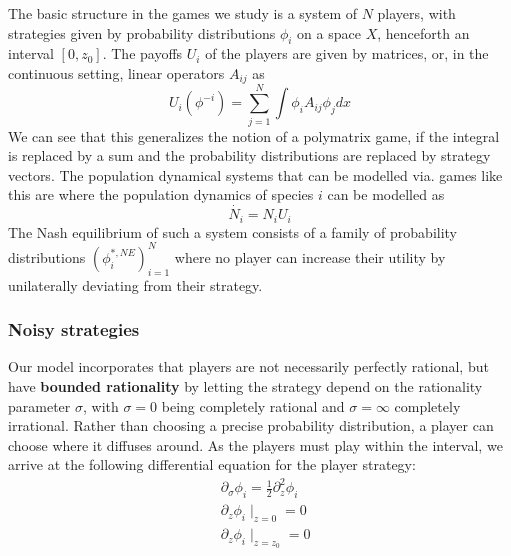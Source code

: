 The basic structure in the games we study is a system of $N$ players, with strategies given by probability distributions $\phi_i$ on a space $X$, henceforth an interval $[0,z_0]$. The payoffs $U_i$ of the players are given by matrices, or, in the continuous setting, linear operators $A_{ij}$ as
\begin{equation}
  \label{eq:utility}
  U_i(\phi^{-i}) = \sum_{j=1}^N \int \phi_i A_{ij} \phi_j dx
\end{equation}
We can see that this generalizes the notion of a polymatrix game, if the integral is replaced by a sum and the probability distributions are replaced by strategy vectors. The population dynamical systems that can be modelled via. games like this are where the population dynamics of species $i$ can be modelled as
\begin{equation}
  \dot{N_i} = N_i U_i
\end{equation}
The Nash equilibrium of such a system consists of a family of probability distributions $(\phi_i^{*,NE})_{i=1}^N$ where no player can increase their utility by unilaterally deviating from their strategy.

\subsubsection*{Noisy strategies}
Our model incorporates that players are not necessarily perfectly rational, but have \textbf{bounded rationality} by letting the strategy depend on the rationality parameter $\sigma$, with $\sigma=0$ being completely rational and $\sigma = \infty$ completely irrational. Rather than choosing a precise probability distribution, a player can choose where it diffuses around. As the players must play within the interval, we arrive at the following differential equation for the player strategy:
\begin{align}
  \label{eq:density_PDE}
	&\partial_\sigma \phi_i = \frac{1}{2}\partial_z^2 \phi_i \\
	&\partial_z \phi_i \mid_{z=0} = 0 \\
  &\partial_z \phi_i \mid_{z = z_0} = 0
\end{align}
  
